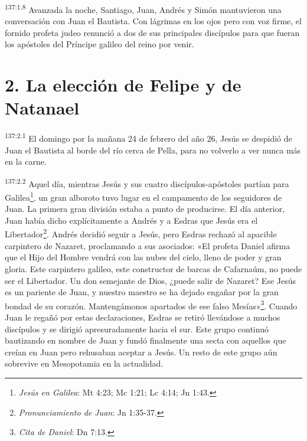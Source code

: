 \par 
\textsuperscript{137:1.8} Avanzada la noche, Santiago, Juan, Andrés y Simón mantuvieron una conversación con Juan el Bautista. Con lágrimas en los ojos pero con voz firme, el fornido profeta judeo renunció a dos de sus principales discípulos para que fueran los apóstoles del Príncipe galileo del reino por venir.

\section*{2. La elección de Felipe y de Natanael}
\par 
\textsuperscript{137:2.1} El domingo por la mañana 24 de febrero del año 26, Jesús se despidió de Juan el Bautista al borde del río cerca de Pella, para no volverlo a ver nunca más en la carne.

\par 
\textsuperscript{137:2.2} Aquel día, mientras Jesús y sus cuatro discípulos-apóstoles partían para Galilea\footnote{\textit{Jesús en Galilea}: Mt 4:23; Mc 1:21; Lc 4:14; Jn 1:43.}, un gran alboroto tuvo lugar en el campamento de los seguidores de Juan. La primera gran división estaba a punto de producirse. El día anterior, Juan había dicho explícitamente a Andrés y a Esdras que Jesús era el Libertador\footnote{\textit{Pronunciamiento de Juan}: Jn 1:35-37.}. Andrés decidió seguir a Jesús, pero Esdras rechazó al apacible carpintero de Nazaret, proclamando a sus asociados: «El profeta Daniel afirma que el Hijo del Hombre vendrá con las nubes del cielo, lleno de poder y gran gloria. Este carpintero galileo, este constructor de barcas de Cafarnaúm, no puede ser el Libertador. Un don semejante de Dios, ¿puede salir de Nazaret? Ese Jesús es un pariente de Juan, y nuestro maestro se ha dejado engañar por la gran bondad de su corazón. Mantengámonos apartados de ese falso Mesías»\footnote{\textit{Cita de Daniel}: Dn 7:13.}. Cuando Juan le regañó por estas declaraciones, Esdras se retiró llevándose a muchos discípulos y se dirigió apresuradamente hacia el sur. Este grupo continuó bautizando en nombre de Juan y fundó finalmente una secta con aquellos que creían en Juan pero rehusaban aceptar a Jesús. Un resto de este grupo aún sobrevive en Mesopotamia en la actualidad.

